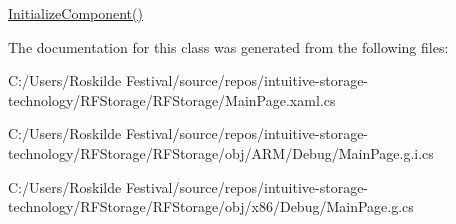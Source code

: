 \mbox{\hyperlink{class_r_f_storage_1_1_main_page_a44b868cd44ff5ee9dbe953b104a1f9a1}{Initialize\+Component()}} 



The documentation for this class was generated from the following files\+:\begin{DoxyCompactItemize}
\item 
C\+:/\+Users/\+Roskilde Festival/source/repos/intuitive-\/storage-\/technology/\+R\+F\+Storage/\+R\+F\+Storage/Main\+Page.\+xaml.\+cs\item 
C\+:/\+Users/\+Roskilde Festival/source/repos/intuitive-\/storage-\/technology/\+R\+F\+Storage/\+R\+F\+Storage/obj/\+A\+R\+M/\+Debug/Main\+Page.\+g.\+i.\+cs\item 
C\+:/\+Users/\+Roskilde Festival/source/repos/intuitive-\/storage-\/technology/\+R\+F\+Storage/\+R\+F\+Storage/obj/x86/\+Debug/Main\+Page.\+g.\+cs\end{DoxyCompactItemize}

